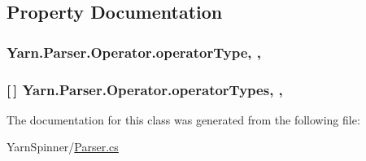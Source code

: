 \subsection{Property Documentation}
\hypertarget{a00117_ac2de2f59be0e69b316627a4de16fadd3}{
\subsubsection[{operator\-Type}]{ Yarn.\-Parser.\-Operator.\-operator\-Type\hspace{0.3cm}{\ttfamily [get]}, {\ttfamily [set]}, {\ttfamily [package]}}}\label{a00117_ac2de2f59be0e69b316627a4de16fadd3}
\hypertarget{a00117_a8dca7db3b76b8c358aba6068274e07df}{
\subsubsection[{operator\-Types}]{ \mbox{[}$\,$\mbox{]} Yarn.\-Parser.\-Operator.\-operator\-Types\hspace{0.3cm}{\ttfamily [static]}, {\ttfamily [get]}, {\ttfamily [package]}}}\label{a00117_a8dca7db3b76b8c358aba6068274e07df}


The documentation for this class was generated from the following file\-:\begin{DoxyCompactItemize}
\item 
Yarn\-Spinner/\hyperlink{a00269}{Parser.\-cs}\end{DoxyCompactItemize}
